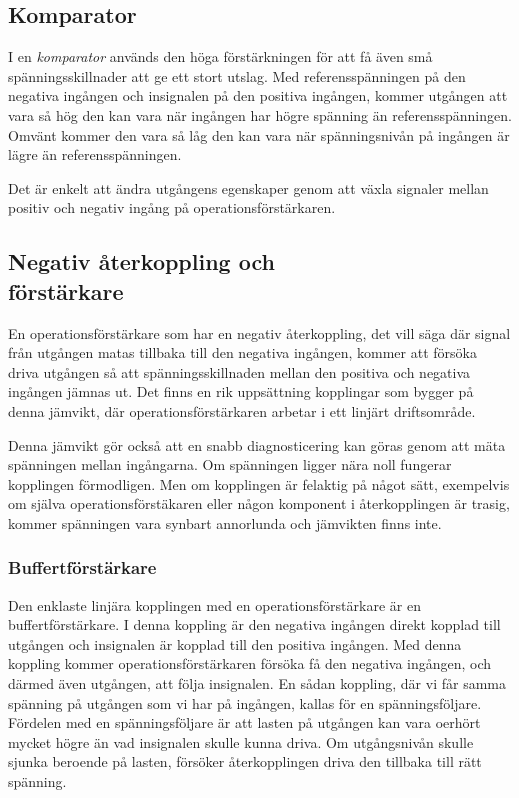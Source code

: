 \subsection{Komparator}

I en \emph{komparator} används den höga förstärkningen för att få även små
spänningsskillnader att ge ett stort utslag.
Med referensspänningen på den negativa ingången och insignalen på den positiva
ingången, kommer utgången att vara så hög den kan vara när ingången har högre
spänning än referensspänningen.
Omvänt kommer den vara så låg den kan vara när spänningsnivån på ingången är
lägre än referensspänningen.

Det är enkelt att ändra utgångens egenskaper genom att växla signaler mellan
positiv och negativ ingång på operationsförstärkaren.

\subsection{Negativ återkoppling och\\ förstärkare}

En operationsförstärkare som har en negativ återkoppling, det vill säga där
signal från utgången matas tillbaka till den negativa ingången, kommer att
försöka driva utgången så att spänningsskillnaden mellan den positiva och
negativa ingången jämnas ut.
Det finns en rik uppsättning kopplingar som bygger på denna jämvikt, där
operationsförstärkaren arbetar i ett linjärt driftsområde.

Denna jämvikt gör också att en snabb diagnosticering kan göras genom att mäta
spänningen mellan ingångarna.
Om spänningen ligger nära noll fungerar kopplingen förmodligen.
Men om kopplingen är felaktig på något sätt, exempelvis om själva
operationsförstäkaren eller någon komponent i återkopplingen är trasig, kommer
spänningen vara synbart annorlunda och jämvikten finns inte.

\subsubsection{Buffertförstärkare}

Den enklaste linjära kopplingen med en operationsförstärkare är en
buffertförstärkare.
I denna koppling är den negativa ingången direkt kopplad till utgången och
insignalen är kopplad till den positiva ingången.
Med denna koppling kommer operationsförstärkaren försöka få den negativa
ingången, och därmed även utgången, att följa insignalen.
En sådan koppling, där vi får samma spänning på utgången som vi har på
ingången, kallas för en spänningsföljare.
Fördelen med en spänningsföljare är att lasten på utgången kan vara oerhört
mycket högre än vad insignalen skulle kunna driva.
Om utgångsnivån skulle sjunka beroende på lasten, försöker återkopplingen driva
den tillbaka till rätt spänning.

